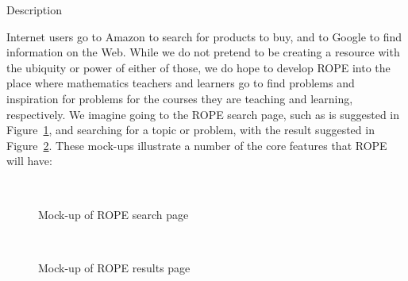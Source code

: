 \documentclass[11pt]{article}
\begin{document}
\begin{section}{Description}

Internet users go to Amazon to search for products to buy, and to
Google to find information on the Web.  While we do not pretend to be
creating a resource with the ubiquity or power of either of those, we do
hope to develop ROPE into the place where mathematics teachers and
learners go to find problems and inspiration for problems for the courses
they are teaching and learning, respectively.  We imagine going to the
ROPE search page, such as is suggested in Figure~\ref{rope1}, and
searching for a topic or problem, with the result suggested in
Figure~\ref{rope2}.  These mock-ups illustrate a number of the core
features that ROPE will have:

\begin{figure}
\begin{center}
\\
\caption{Mock-up of ROPE search page}
\label{rope1}
\end{center}
\end{figure}

\begin{figure}
\begin{center}
\\
\caption{Mock-up of ROPE results page}
\label{rope2}
\end{center}
\end{figure}


\end{section}
\end{document}
